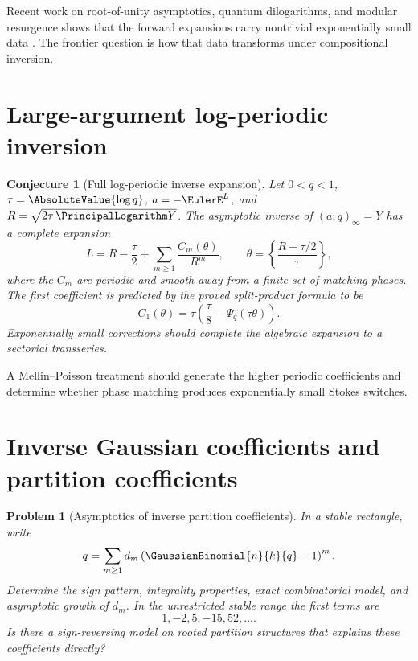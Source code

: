 \documentclass[11pt,a4paper,oneside,openany]{book}
\newtheorem{conjecture}[theorem]{Conjecture}
\newtheorem{problem}[theorem]{Problem}
\theoremstyle{definition}
\theoremstyle{remark}
\begin{document}
Recent work on root-of-unity asymptotics, quantum dilogarithms, and modular
resurgence shows that the forward expansions carry nontrivial exponentially
small data \cite{Kopp2025,Fantini2025}.  The frontier question is how that data
transforms under compositional inversion.

\section{Large-argument log-periodic inversion}

\begin{conjecture}[Full log-periodic inverse expansion]
Let \(0<q<1\), \(\tau=\AbsoluteValue{\log q}\), \(a=-\EulerE^L\), and
\(R=\sqrt{2\tau\,\PrincipalLogarithm Y}\).  The asymptotic inverse of
\((a;q)_\infty=Y\) has a complete expansion
\begin{equation}\label{eq:logperiodic-full-conjecture}
 L=R-\frac{\tau}{2}
 +\sum_{m\ge1}\frac{C_m(\theta)}{R^m},
 \qquad
 \theta=\left\{\frac{R-\tau/2}{\tau}\right\},
\end{equation}
where the \(C_m\) are periodic and smooth away from a finite set of matching
phases.  The first coefficient is predicted by the proved split-product
formula to be
\[
 C_1(\theta)=\tau\left(\frac{\tau}{8}-\Psi_q(\tau\theta)\right).
\]
Exponentially small corrections should complete the algebraic expansion to a
sectorial transseries.
\end{conjecture}

A Mellin--Poisson treatment should generate the higher periodic coefficients
and determine whether phase matching produces exponentially small Stokes
switches.

\section{Inverse Gaussian coefficients and partition coefficients}

\begin{problem}[Asymptotics of inverse partition coefficients]
\label{prob:inverse-partition-coefficients}
In a stable rectangle, write
\begin{equation}\label{eq:inverse-gaussian-coeffs}
 q=\sum_{m\ge1}d_m\left(\GaussianBinomial{n}{k}{q}-1\right)^m.
\end{equation}
Determine the sign pattern, integrality properties, exact combinatorial model,
and asymptotic growth of \(d_m\).  In the unrestricted stable range the first
terms are
\begin{equation}\label{eq:inverse-gaussian-first}
 1,-2,5,-15,52,\ldots.
\end{equation}
Is there a sign-reversing model on rooted partition structures that explains
these coefficients directly?
\end{problem}
\end{document}
